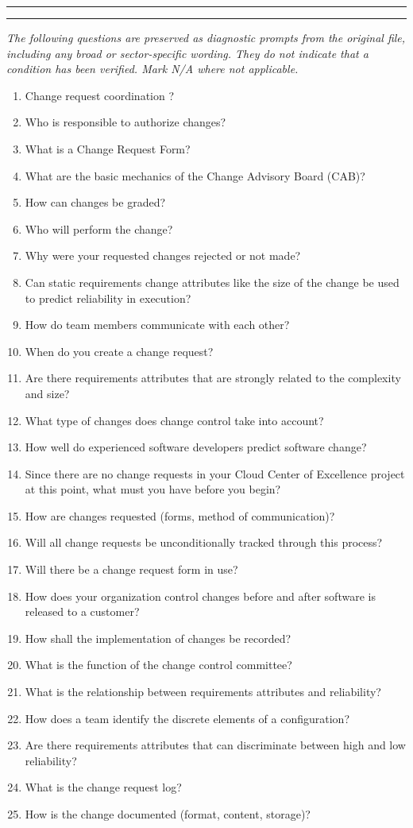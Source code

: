 \documentclass[10pt,letterpaper]{article}
\newcommand{\writelines}{\par\noindent\color{rulegrey}\rule{\linewidth}{.35pt}\par\vspace{7pt}\rule{\linewidth}{.35pt}\color{black}\par\vspace{7pt}}
\newcommand{\docsection}[1]{\par\Needspace{5\baselineskip}\vspace{8pt}{\large\sffamily\bfseries\color{navy}#1}\par\vspace{2pt}{\color{rulegrey}\rule{\linewidth}{.6pt}}\par}
\newcommand{\smallsection}[1]{\par\Needspace{3\baselineskip}\vspace{5pt}{\normalsize\sffamily\bfseries\color{blue}#1}\par}
\begin{document}
\smallsection{Date:}
\writelines
\docsection{03 \quad Source diagnostic checklist}
\textit{The following questions are preserved as diagnostic prompts from the original file, including any broad or sector-specific wording. They do not indicate that a condition has been verified. Mark N/A where not applicable.}
\begingroup\small\begin{enumerate}[leftmargin=2.1em, itemsep=4pt]
\item[1.] Change request coordination ?
\item[2.] Who is responsible to authorize changes?
\item[3.] What is a Change Request Form?
\item[4.] What are the basic mechanics of the Change Advisory Board (CAB)?
\item[5.] How can changes be graded?
\item[6.] Who will perform the change?
\item[7.] Why were your requested changes rejected or not made?
\item[8.] Can static requirements change attributes like the size of the change be used to predict reliability in execution?
\item[9.] How do team members communicate with each other?
\item[10.] When do you create a change request?
\item[11.] Are there requirements attributes that are strongly related to the complexity and size?
\item[12.] What type of changes does change control take into account?
\item[13.] How well do experienced software developers predict software change?
\item[14.] Since there are no change requests in your Cloud Center of Excellence project at this point, what must you have before you begin?
\item[15.] How are changes requested (forms, method of communication)?
\item[16.] Will all change requests be unconditionally tracked through this process?
\item[17.] Will there be a change request form in use?
\item[18.] How does your organization control changes before and after software is released to a customer?
\item[19.] How shall the implementation of changes be recorded?
\item[20.] What is the function of the change control committee?
\item[21.] What is the relationship between requirements attributes and reliability?
\item[22.] How does a team identify the discrete elements of a configuration?
\item[23.] Are there requirements attributes that can discriminate between high and low reliability?
\item[24.] What is the change request log?
\item[25.] How is the change documented (format, content, storage)?
\end{enumerate}\endgroup
\end{document}
